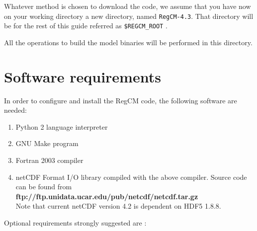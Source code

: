 %
%

Whatever method is chosen to download the code, we assume that you have now
on your working directory a new directory, named \verb=RegCM-4.3=.
That directory will be for the rest of this guide referred as 
\verb=$REGCM_ROOT= .

All the operations to build the model binaries will be performed in this
directory.

\section{Software requirements}

In order to configure and install the RegCM code, the following software are
needed:

\begin{enumerate}
\item Python 2 language interpreter
\item GNU Make program
\item Fortran 2003 compiler
\item netCDF \cite{Rew_90} Format I/O library compiled with the above compiler.
   Source code can be found from \\
{\bf ftp://ftp.unidata.ucar.edu/pub/netcdf/netcdf.tar.gz} \\
Note that current netCDF version 4.2 is dependent on HDF5 1.8.8.
\end{enumerate}

Optional requirements strongly suggested are :

